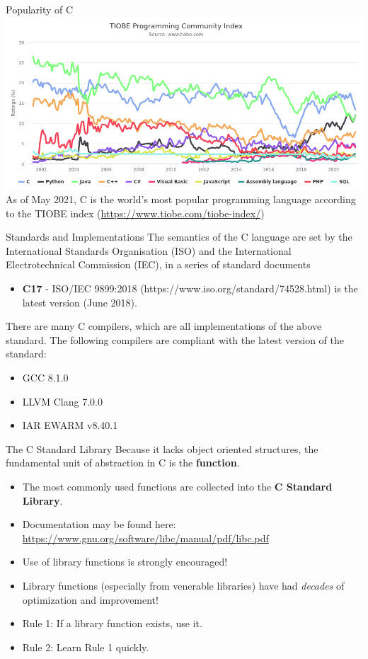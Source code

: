 \documentclass[11pt]{beamer}
\begin{document}
\begin{frame}{Popularity of C}
\center
\includegraphics[scale=0.31]{tiobe.png} \\
As of May 2021, C is the world's most popular programming language according to the TIOBE index (\url{https://www.tiobe.com/tiobe-index/})
\end{frame}

\begin{frame}{Standards and Implementations}
The semantics of the C language are set by the International Standards Organisation (ISO) and the International Electrotechnical Commission (IEC), in a series of standard documents
\begin{itemize}
\item \textbf{C17} - ISO/IEC 9899:2018 (https://www.iso.org/standard/74528.html) is the latest version (June 2018).
\end{itemize}
There are many C compilers, which are all implementations of the above standard.  The following compilers are compliant with the latest version of the standard:
\begin{itemize}
\item GCC 8.1.0 
\item LLVM Clang 7.0.0
\item IAR EWARM v8.40.1
\end{itemize}
\end{frame}

\begin{frame}{The C Standard Library}
Because it lacks object oriented structures, the fundamental unit of abstraction in C is the \textbf{function}. 
\begin{itemize}
\item The most commonly used functions are collected into the \textbf{C Standard Library}.
\item Documentation may be found here: \url{https://www.gnu.org/software/libc/manual/pdf/libc.pdf}
\item Use of library functions is strongly encouraged!  
\item Library functions (especially from venerable libraries) have had \emph{decades} of optimization and improvement!  
\item Rule 1: If a library function exists, use it.
\item Rule 2: Learn Rule 1 quickly.  
\end{itemize}
\end{frame}
\end{document}

